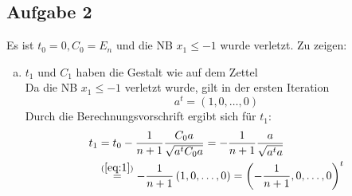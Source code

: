 \documentclass[11pt,a4paper,ngerman]{article}
\begin{document}
\subsection*{Aufgabe 2}
Es ist $t_0 = 0, C_0 = E_n$ und die NB $x_1 \leq -1$ wurde verletzt.
Zu zeigen:
\begin{enumerate}[(a)]
\item $t_1$ und $C_1$ haben die Gestalt wie auf dem Zettel \\
    Da die NB $x_1 \leq -1$ verletzt wurde, gilt in der ersten Iteration
    \begin{equation}\label{eq:1}
      a^t = \left(1,0,\ldots,0 \right)
    \end{equation}
    Durch die Berechnungsvorschrift ergibt sich für $t_1$:
    \begin{equation*}\begin{split}
      t_1 &= t_0 -\frac{1}{n+1} \frac{C_0 a}{\sqrt{a^t C_0 a}}
          = -\frac{1}{n+1} \frac{a}{\sqrt{a^t a}} \\
          &\stackrel{(\ref{eq:1})}{=} -\frac{1}{n+1} \left(1,0,\ldots,0 \right)
          = \left(-\frac{1}{n+1},0,\ldots,0 \right)^t
    \end{split}\end{equation*}
    

\end{enumerate}
\end{document}
